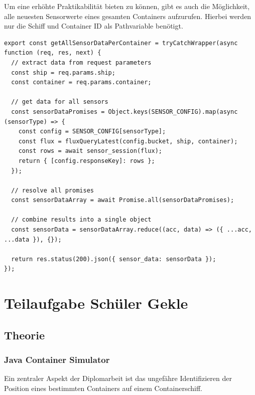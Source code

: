 \documentclass[
    headings=optiontotocandhead,%
    twoside,
    numbers=noenddot,%
    12pt, %
    titlepage, %
    parskip=full, %
    listof=leveldown, 
    numbers=noenddot, %
    a4paper,DIV=14,
    BCOR=15mm,
]{scrbook}
\makeatletter
\newcommand*{\authormark}{}
\newcommand*{\textauthor}[1]{%
   \renewcommand{\authormark}{\translate{author}: #1}%
   \ignorespaces
}
\newcommand*{\the@orig@section}{}
\let\the@orig@section\section
\renewcommand*{\section}{%
  \clearpage
  \the@orig@section
}
\makeatother
\begin{document}
Um eine erhöhte Praktikabilität bieten zu können, gibt es auch die
Möglichkeit, alle neuesten Sensorwerte eines gesamten Containers
aufzurufen. Hierbei werden nur die Schiff und Container ID als
Pathvariable benötigt.

\begin{lstlisting}[caption={Funktion um alle Sensordaten eines Container zu bekommen}]
export const getAllSensorDataPerContainer = tryCatchWrapper(async function (req, res, next) {
  // extract data from request parameters
  const ship = req.params.ship;
  const container = req.params.container;

  // get data for all sensors
  const sensorDataPromises = Object.keys(SENSOR_CONFIG).map(async (sensorType) => {
    const config = SENSOR_CONFIG[sensorType];
    const flux = fluxQueryLatest(config.bucket, ship, container);
    const rows = await sensor_session(flux);
    return { [config.responseKey]: rows };
  });

  // resolve all promises
  const sensorDataArray = await Promise.all(sensorDataPromises);

  // combine results into a single object
  const sensorData = sensorDataArray.reduce((acc, data) => ({ ...acc, ...data }), {});

  return res.status(200).json({ sensor_data: sensorData });
});
\end{lstlisting}

\hypertarget{teilaufgabe-schuxfcler-gekle}{%
\section{Teilaufgabe Schüler Gekle}\label{teilaufgabe-schuxfcler-gekle}}

\textauthor{Luca Alexander Gekle}

\hypertarget{theorie-2}{%
\subsection{Theorie}\label{theorie-2}}

\hypertarget{java-container-simulator}{%
\subsubsection{Java Container
Simulator}\label{java-container-simulator}}

Ein zentraler Aspekt der Diplomarbeit ist das ungefähre Identifizieren
der Position eines bestimmten Containers auf einem Containerschiff.
\end{document}

